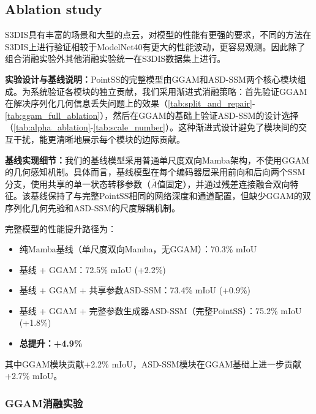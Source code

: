 \documentclass[preprint,12pt]{elsarticle}
\begin{document}
\subsection{Ablation study}
S3DIS具有丰富的场景和大型的点云，对模型的性能有更强的要求，不同的方法在S3DIS上进行验证相较于ModelNet40有更大的性能波动，更容易观测。因此除了组合消融实验外其他消融实验统一在S3DIS数据集上进行。

\textbf{实验设计与基线说明：}PointSS的完整模型由GGAM和ASD-SSM两个核心模块组成。为系统验证各模块的独立贡献，我们采用渐进式消融策略：首先验证GGAM在解决序列化几何信息丢失问题上的效果（\cref{tab:split_and_repair}-\cref{tab:ggam_full_ablation}），然后在GGAM的基础上验证ASD-SSM的设计选择（\cref{tab:alpha_ablation}-\cref{tab:scale_number}）。这种渐进式设计避免了模块间的交互干扰，能更清晰地展示每个模块的边际贡献。

\textbf{基线实现细节：}我们的基线模型采用普通单尺度双向Mamba架构，不使用GGAM的几何感知机制。具体而言，基线模型在每个编码器层采用前向和后向两个SSM分支，使用共享的单一状态转移参数（$\overline{A}$值固定），并通过残差连接融合双向特征。该基线保持了与完整PointSS相同的网络深度和通道配置，但缺少GGAM的双序列化几何先验和ASD-SSM的尺度解耦机制。

完整模型的性能提升路径为：
\begin{itemize}
	\item 纯Mamba基线（单尺度双向Mamba，无GGAM）：70.3\% mIoU
	\item 基线 + GGAM：72.5\% mIoU (+2.2\%)
	\item 基线 + GGAM + 共享参数ASD-SSM：73.4\% mIoU (+0.9\%)
	\item 基线 + GGAM + 完整参数生成器ASD-SSM（完整PointSS）：75.2\% mIoU (+1.8\%)
	\item \textbf{总提升：+4.9\%}
\end{itemize}
其中GGAM模块贡献+2.2\% mIoU，ASD-SSM模块在GGAM基础上进一步贡献+2.7\% mIoU。




\subsubsection{GGAM消融实验}
\end{document}
